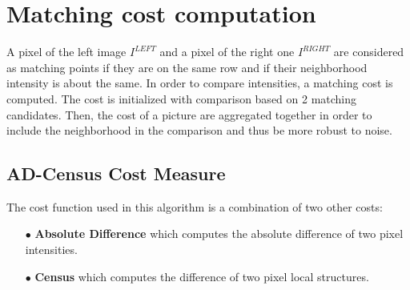 \documentclass{article}
\begin{document}
\newpage

\section{Matching cost computation}

A pixel of the left image $I^{LEFT}$ and a pixel of the right one $I^{RIGHT}$ are considered as matching points if they are on the same row and if their neighborhood intensity is about the same. In order to compare intensities, a matching cost is computed. The cost is initialized with comparison based on 2 matching candidates. Then, the cost of a picture are aggregated together in order to include the neighborhood in the comparison and thus be more robust to noise. 

\subsection{AD-Census Cost Measure}

The cost function used in this algorithm is a combination of two other costs:
\begin{itemize}
	\item[$\bullet$]\textbf{ Absolute Difference} which computes the absolute difference of two pixel intensities.
	\item[$\bullet$]\textbf{ Census} which computes the difference of two pixel local structures.
\end{itemize}
\end{document}
